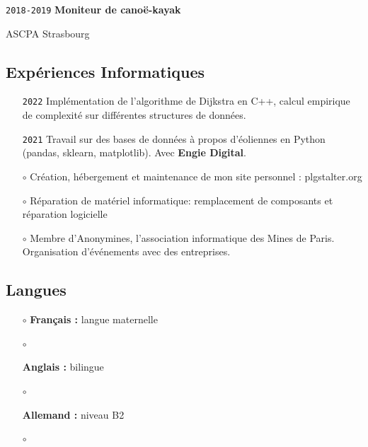 \documentclass{article}
\begin{document}
\begin{multicols}{2}
\hfill

		\noindent\texttt{2018-2019} \textbf{Moniteur de canoë-kayak}

		ASCPA Strasbourg

\hfill

{\color{blue} \subsection*{Expériences Informatiques}}

		\begin{itemize}
			\item[\texttt{2022}]
				Implémentation de l'algorithme de Dijkstra en C++, calcul empirique de complexité sur différentes structures de données.
	
			\hfill

			\item[\texttt{2021}]
				Travail sur des bases de données à propos d'éoliennes en Python (pandas, sklearn, matplotlib). Avec \textbf{Engie Digital}.

			\hfill

			\item[$\circ$]
				Création, hébergement et maintenance de mon site personnel : plgstalter.org 
		
			\hfill

			\item[$\circ$]
				Réparation de matériel informatique: remplacement de composants et réparation logicielle

			\hfill

			\item[$\circ$]
				Membre d'Anonymines, l'association informatique des Mines de Paris. Organisation d'événements avec des entreprises.
		\end{itemize}

\columnbreak
	{\color{blue} \subsection*{Langues}}

		\begin{itemize}
			\item[$\circ$]
			\textbf{Français : } langue maternelle
		\item[$\circ$]

			\textbf{Anglais : } bilingue
		\item[$\circ$]

			\textbf{Allemand :} niveau B2
		\item[$\circ$]


\end{itemize}
\end{multicols}
\end{document}
